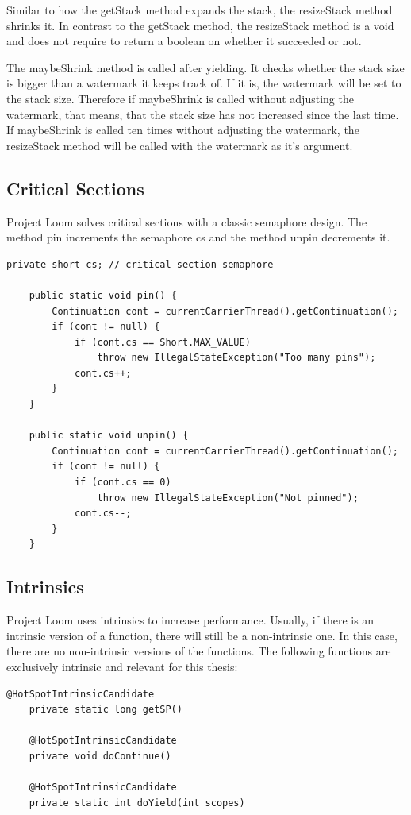 Similar to how the getStack method expands the stack, the resizeStack method shrinks it. In contrast to the getStack method, the resizeStack method is a void and does not require to return a boolean on whether it succeeded or not.

The maybeShrink method is called after yielding. It checks whether the stack size is bigger than a watermark it keeps track of. If it is, the watermark will be set to the stack size. Therefore if maybeShrink is called without adjusting the watermark, that means, that the stack size has not increased since the last time. If maybeShrink is called ten times without adjusting the watermark, the resizeStack method will be called with the watermark as it's argument.

\subsection{Critical Sections}
Project Loom solves critical sections with a classic semaphore design. The method pin increments the semaphore cs and the method unpin decrements it.

\begin{lstlisting}[language=custom-java]
    private short cs; // critical section semaphore

    public static void pin() {
        Continuation cont = currentCarrierThread().getContinuation();
        if (cont != null) {
            if (cont.cs == Short.MAX_VALUE)
                throw new IllegalStateException("Too many pins");
            cont.cs++;
        }
    }

    public static void unpin() {
        Continuation cont = currentCarrierThread().getContinuation();
        if (cont != null) {
            if (cont.cs == 0)
                throw new IllegalStateException("Not pinned");
            cont.cs--;
        }
    }
\end{lstlisting}

\subsection{Intrinsics}
Project Loom uses intrinsics to increase performance. Usually, if there is an intrinsic version of a function, there will still be a non-intrinsic one. In this case, there are no non-intrinsic versions of the functions. The following functions are exclusively intrinsic and relevant for this thesis:
\begin{lstlisting}[language=custom-java]
    @HotSpotIntrinsicCandidate
    private static long getSP()

    @HotSpotIntrinsicCandidate
    private void doContinue() 

    @HotSpotIntrinsicCandidate
    private static int doYield(int scopes)
\end{lstlisting}

